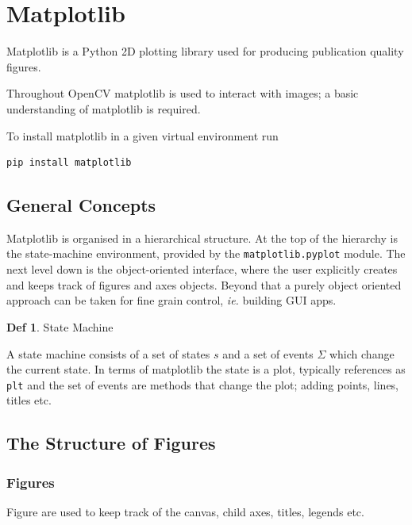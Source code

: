 \documentclass{article}
\theoremstyle{definition}
\newtheorem{df}{Def}
\theoremstyle{remark}
\begin{document}
\section{Matplotlib}

Matplotlib is a Python 2D plotting library used for producing publication quality figures. 

Throughout OpenCV matplotlib is used to interact with images; a basic understanding of matplotlib is required.

To install matplotlib in a given virtual environment run

\begin{lstlisting}[language=bash]
pip install matplotlib
\end{lstlisting}

\subsection{General Concepts}

Matplotlib is organised in a hierarchical structure. At the top of the hierarchy is the state-machine environment, provided by the \lstinline{matplotlib.pyplot} module. The next level down is the object-oriented interface, where the user explicitly creates and keeps track of figures and axes objects. Beyond that a purely object oriented approach can be taken for fine grain control, \textit{ie.} building GUI apps. 

\begin{df}State Machine

    A state machine consists of a set of states $ s $ and a set of events $ \Sigma $ which change the current state. In terms of matplotlib the state is a plot, typically references as \lstinline{plt} and the set of events are methods that change the plot; adding points, lines, titles etc.
\end{df}

\newpage

\subsection{The Structure of Figures}

\subsubsection{Figures}

Figure are used to keep track of the canvas, child axes, titles, legends etc. 
\end{document}
